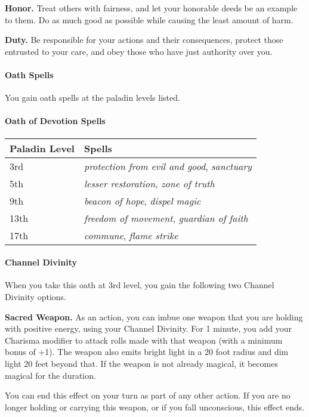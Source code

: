 \documentclass[
]{article}
\begin{document}
\textbf{Honor.} Treat others with fairness, and let your honorable deeds
be an example to them. Do as much good as possible while causing the
least amount of harm.

\textbf{Duty.} Be responsible for your actions and their consequences,
protect those entrusted to your care, and obey those who have just
authority over you.

\hypertarget{oath-spells-1}{%
\paragraph{Oath Spells}\label{oath-spells-1}}

You gain oath spells at the paladin levels listed.

\hypertarget{oath-of-devotion-spells}{%
\paragraph{Oath of Devotion Spells}\label{oath-of-devotion-spells}}

\begin{longtable}[]{@{}ll@{}}
\toprule
Paladin Level & Spells\tabularnewline
\midrule
\endhead
3rd & \emph{protection from evil and good},
\emph{sanctuary}\tabularnewline
5th & \emph{lesser restoration}, \emph{zone of truth}\tabularnewline
9th & \emph{beacon of hope}, \emph{dispel magic}\tabularnewline
13th & \emph{freedom of movement}, \emph{guardian of
faith}\tabularnewline
17th & \emph{commune}, \emph{flame strike}\tabularnewline
\bottomrule
\end{longtable}

\hypertarget{channel-divinity-1}{%
\paragraph{Channel Divinity}\label{channel-divinity-1}}

When you take this oath at 3rd level, you gain the following two Channel
Divinity options.

\textbf{Sacred Weapon.} As an action, you can imbue one weapon that you
are holding with positive energy, using your Channel Divinity. For 1
minute, you add your Charisma modifier to attack rolls made with that
weapon (with a minimum bonus of +1). The weapon also emits bright light
in a 20 foot radius and dim light 20 feet beyond that. If the weapon is
not already magical, it becomes magical for the duration.

You can end this effect on your turn as part of any other action. If you
are no longer holding or carrying this weapon, or if you fall
unconscious, this effect ends.
\end{document}

